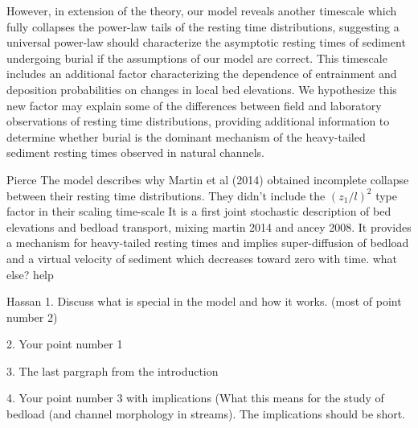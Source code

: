 \documentclass[draft]{agujournal2018}
\begin{document}
However, in extension of the \citet{Martin2014} theory, our model reveals another timescale which fully collapses the power-law tails of the resting time distributions, suggesting a universal power-law should characterize the asymptotic resting times of sediment undergoing burial if the assumptions of our model are correct.
This timescale includes an additional factor characterizing the dependence of entrainment and deposition probabilities on changes in local bed elevations.
We hypothesize this new factor may explain some of the differences between field \citep[e.g.][]{Olinde2015} and laboratory \citep[e.g.][]{Martin2014} observations of resting time distributions, providing additional information to determine whether burial is the dominant mechanism of the heavy-tailed sediment resting times observed in natural channels.


Pierce
The model describes why Martin et al (2014) obtained incomplete collapse between their resting time distributions. They didn't include the $(z_1/l)^2$ type factor in their scaling time-scale
It is a first joint stochastic description of bed elevations and bedload transport, mixing martin 2014 and ancey 2008. 
It provides a mechanism for heavy-tailed resting times and implies super-diffusion of bedload and a virtual velocity of sediment which decreases toward zero with time. 
 what else? help



Hassan
1.      Discuss what is special in the model and how it works. (most of point number 2)

2.      Your point number 1

3.      The last pargraph from the introduction

4.      Your point number 3 with implications (What this means for the study of bedload (and channel morphology in streams). The implications should be short.
\end{document}
